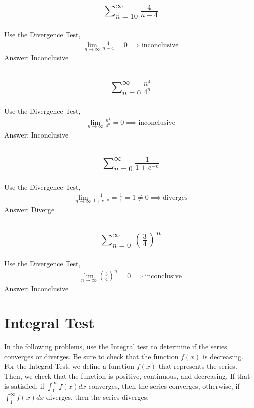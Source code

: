 \documentclass{article}
\begin{document}
\subsection{
	\begin{align*}
		\sum_{n = 10}^\infty \frac{4}{n - 4}
	\end{align*}
}
Use the Divergence Test,
\begin{align*}
	\lim_{n \to \infty} \frac{4}{n - 4} = 0 \implies \text{inconclusive}
\end{align*}
Answer: Inconclusive

\subsection{
	\begin{align*}
		\sum_{n = 0}^\infty \frac{n^4}{4^n}
	\end{align*}
}
Use the Divergence Test,
\begin{align*}
	\lim_{n \to \infty} \frac{n^4}{4^n} = 0 \implies \text{inconclusive}
\end{align*}
Answer: Inconclusive

\subsection{
	\begin{align*}
		\sum_{n = 0}^\infty \frac{1}{1 + e^{-n}}
	\end{align*}
}
Use the Divergence Test,
\begin{align*}
	\lim_{n \to \infty} \frac{1}{1 + e^{-n}} = \frac{1}{1} = 1 \neq 0 \implies \text{diverges}
\end{align*}
Answer: Diverge

\subsection{
	\begin{align*}
		\sum_{n = 0}^\infty \left( \frac{3}{4} \right)^n
	\end{align*}
}
Use the Divergence Test,
\begin{align*}
	\lim_{n \to \infty} \left( \frac{3}{4} \right)^n = 0 \implies \text{inconclusive}
\end{align*}
Answer: Inconclusive

\section{Integral Test}
In the following problems, use the Integral test to determine if the series converges or diverges. Be sure to check that the function $f(x)$ is decreasing. \\[10pt]
For the Integral Test, we define a function $f(x)$ that represents the series. Then, we check that the function is positive, continuous, and decreasing. If that is satisfied, if $\int_1^\infty {f(x)dx}$ converges, then the series converges, otherwise, if $\int_1^\infty {f(x)dx}$ diverges, then the series diverges.
\end{document}
